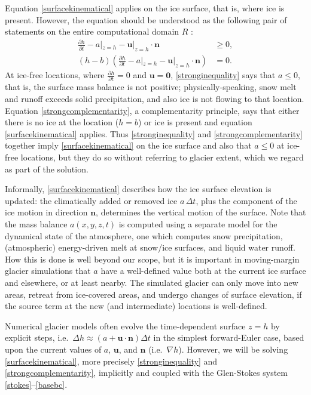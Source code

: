 \documentclass[letterpaper,final,12pt,reqno]{amsart}
\newcommand{\grad}{\nabla}
\newcommand{\bn}{\mathbf{n}}
\newcommand{\bu}{\mathbf{u}}
\newcommand{\bzero}{\bm{0}}
\begin{document}
Equation \eqref{surfacekinematical} applies on the ice surface, that is, where ice is present.  However, the equation should be understood as the following pair of statements on the entire computational domain $R$ \cite{Bueler2016,Bueler2020,SchoofHewitt2013}:
\begin{align}
\frac{\partial h}{\partial t} - a|_{z=h} - \bu|_{z=h} \cdot \bn &\ge 0, \label{stronginequality} \\
(h-b) \left(\frac{\partial h}{\partial t} - a|_{z=h} - \bu|_{z=h} \cdot \bn\right) &= 0. \label{strongcomplementarity}
\end{align}
At ice-free locations, where $\frac{\partial h}{\partial t}=0$ and $\bu=\bzero$, \eqref{stronginequality} says that $a \le 0$, that is, the surface mass balance is not positive; physically-speaking, snow melt and runoff exceeds solid precipitation, and also ice is not flowing to that location.  Equation \eqref{strongcomplementarity}, a complementarity principle, says that either there is no ice at the location ($h=b$) or ice is present and equation \eqref{surfacekinematical} applies.  Thus \eqref{stronginequality} and \eqref{strongcomplementarity} together imply \eqref{surfacekinematical} on the ice surface and also that $a\le 0$ at ice-free locations, but they do so without referring to glacier extent, which we regard as part of the solution.

Informally, \eqref{surfacekinematical} describes how the ice surface elevation is updated: the climatically added or removed ice $a\,\Delta t$, plus the component of the ice motion in direction $\bn$, determines the vertical motion of the surface.  Note that the mass balance $a(x,y,z,t)$ is computed using a separate model for the dynamical state of the atmosphere, one which computes snow precipitation, (atmospheric) energy-driven melt at snow/ice surfaces, and liquid water runoff.  How this is done is well beyond our scope, but it is important in moving-margin glacier simulations that $a$ have a well-defined value both at the current ice surface and elsewhere, or at least nearby.  The simulated glacier can only move into new areas, retreat from ice-covered areas, and undergo changes of surface elevation, if the source term at the new (and intermediate) locations is well-defined.

Numerical glacier models often evolve the time-dependent surface $z=h$ by explicit steps, i.e.~$\Delta h \approx \left(a + \bu\cdot \bn\right) \Delta t$ in the simplest forward-Euler case, based upon the current values of $a$, $\bu$, and $\bn$ (i.e.~$\grad h$).  However, we will be solving \eqref{surfacekinematical}, more precisely \eqref{stronginequality} and \eqref{strongcomplementarity}, implicitly and coupled with the Glen-Stokes system \eqref{stokes}--\eqref{basebc}.
\end{document}
